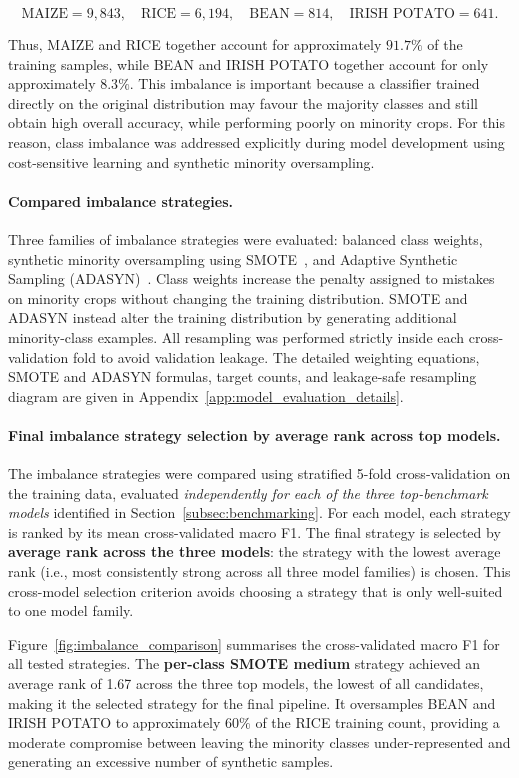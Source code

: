 \[
\text{MAIZE}=9{,}843,\quad
\text{RICE}=6{,}194,\quad
\text{BEAN}=814,\quad
\text{IRISH POTATO}=641.
\]

Thus, MAIZE and RICE together account for approximately \(91.7\%\) of the
training samples, while BEAN and IRISH POTATO together account for only
approximately \(8.3\%\). This imbalance is important because a classifier
trained directly on the original distribution may favour the majority
classes and still obtain high overall accuracy, while performing poorly on
minority crops. For this reason, class imbalance was addressed explicitly
during model development using cost-sensitive learning and synthetic
minority oversampling.

\paragraph{Compared imbalance strategies.}
Three families of imbalance strategies were evaluated: balanced class
weights, synthetic minority oversampling using SMOTE~\cite{chawla2002smote},
and Adaptive Synthetic Sampling (ADASYN)~\cite{he2008adasyn}. Class
weights increase the penalty assigned to mistakes on minority crops without
changing the training distribution. SMOTE and ADASYN instead alter the
training distribution by generating additional minority-class examples.
All resampling was performed strictly inside each cross-validation fold to
avoid validation leakage. The detailed weighting equations, SMOTE and
ADASYN formulas, target counts, and leakage-safe resampling diagram are
given in Appendix~\ref{app:model_evaluation_details}.

\paragraph{Final imbalance strategy selection by average rank across top models.}
The imbalance strategies were compared using stratified 5-fold
cross-validation on the training data, evaluated \emph{independently for
each of the three top-benchmark models} identified in
Section~\ref{subsec:benchmarking}. For each model, each strategy is
ranked by its mean cross-validated macro F1. The final strategy is
selected by \textbf{average rank across the three models}: the strategy
with the lowest average rank (i.e., most consistently strong across all
three model families) is chosen. This cross-model selection criterion
avoids choosing a strategy that is only well-suited to one model family.

Figure~\ref{fig:imbalance_comparison} summarises the cross-validated macro
F1 for all tested strategies. The \textbf{per-class SMOTE medium} strategy
achieved an average rank of 1.67 across the three top models, the lowest
of all candidates, making it the selected strategy for the final pipeline.
It oversamples BEAN and IRISH POTATO to approximately \(60\%\) of the
RICE training count, providing a moderate compromise between leaving the
minority classes under-represented and generating an excessive number of
synthetic samples.

